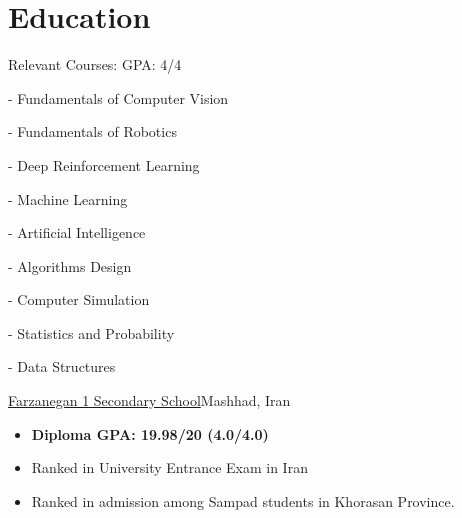 \documentclass[11pt,a4paper,sans]{moderncv}        %
\begin{document}
\vspace*{-1.05mm}
\makecvtitle
\vspace*{-10mm}

\section{Education}
\item{}

{}{Relevant Courses: GPA: 4/4}
\vspace{-1.0em}\begin{small}
 \begin{multicols}{3}
    \begin{itemize}
- Fundamentals of Computer Vision

- Fundamentals of Robotics

- Deep Reinforcement Learning 

- Machine Learning

- Artificial Intelligence

- Algorithms Design

- Computer Simulation

- Statistics and Probability 

- Data Structures 

    \end{itemize}
    \end{multicols}\end{small}
\item{
{\href{https://en.wikipedia.org/wiki/National_Organization_for_Development_of_Exceptional_Talents}{Farzanegan 1 Secondary School}}{Mashhad, Iran}{}{\vspace{3pt} 
\begin{itemize}
    \item \textbf{Diploma GPA: 19.98/20 (4.0/4.0)}
    \item Ranked \textbf{} in University Entrance Exam in Iran
    \item Ranked \textbf{} in admission among Sampad students in Khorasan Province.
\end{itemize}
}}
\end{document}
